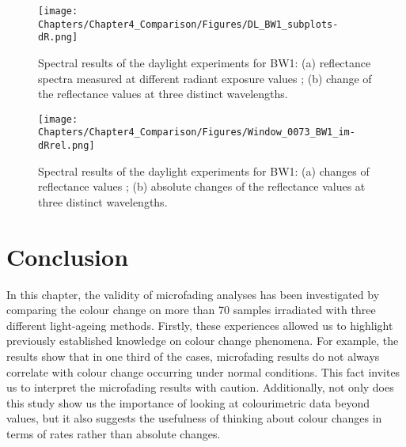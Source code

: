 \begin{figure*}[!h]
\centering
\texttt{[image: Chapters/Chapter4\_Comparison/Figures/DL\_BW1\_subplots-dR.png]}
\caption[\hspace{0.3cm}Spectral results of the daylight experiments for BW1]{Spectral results of the daylight experiments for BW1: (a) reflectance spectra measured at different radiant exposure values ; (b) change of the reflectance values at three distinct wavelengths.}
\label{fig:DL_BW1_SP-dR}
\end{figure*}


\begin{figure*}[!h]
\centering
\texttt{[image: Chapters/Chapter4\_Comparison/Figures/Window\_0073\_BW1\_im-dRrel.png]}
\caption[\hspace{0.3cm}Spectral imaging results of the daylight experiments for BW1]{Spectral results of the daylight experiments for BW1: (a) changes of reflectance values ; (b) absolute changes of the reflectance values at three distinct wavelengths.}
\label{fig:DL_BW1_SP-dR_im}
\end{figure*}


\newpage
\section{Conclusion}


In this chapter, the validity of microfading analyses has been investigated by comparing the colour change on more than 70 samples irradiated with three different light-ageing methods. Firstly, these experiences allowed us to highlight previously established knowledge on colour change phenomena. For example, the results show that in one third of the cases, microfading results do not always correlate with colour change occurring under normal conditions. This fact invites us to interpret the microfading results with caution. Additionally, not only does this study show us the importance of looking at colourimetric data beyond \dEOO values, but it also suggests the usefulness of thinking about colour changes in terms of rates rather than absolute changes. \\


